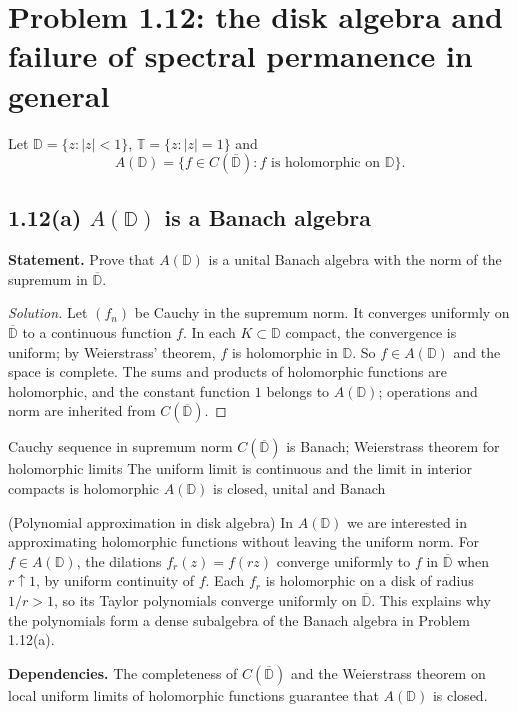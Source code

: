 \section{Problem 1.12: the disk algebra and failure of spectral permanence in general}

Let $\mathbb D=\{z:|z|<1\}$, $\mathbb T=\{z:|z|=1\}$ and
\[
 A(\mathbb D)=\{f\in C(\overline{\mathbb D}): f\text{ is holomorphic on }\mathbb D\}.
\]

\subsection*{1.12(a) $A(\mathbb D)$ is a Banach algebra}

\noindent\textbf{Statement.} Prove that $A(\mathbb D)$ is a unital Banach algebra with the norm of the supremum in $\overline{\mathbb D}$.

\begin{proof}[Solution]
Let $(f_n)$ be Cauchy in the supremum norm. It converges uniformly on $\overline{\mathbb D}$ to a
continuous function $f$. In each $K\subset\mathbb D$ compact, the convergence is uniform; by
Weierstrass' theorem, $f$ is holomorphic in $\mathbb D$. So $f\in A(\mathbb D)$ and the space is
complete. The sums and products of holomorphic functions are holomorphic, and the constant function
$1$ belongs to $A(\mathbb D)$; operations and norm are inherited from
$C(\overline{\mathbb D})$.
\end{proof}

\proofdiagram
{Cauchy sequence in supremum norm}
{$C(\overline{\mathbb D})$ is Banach; Weierstrass theorem for holomorphic limits}
{The uniform limit is continuous and the limit in interior compacts is holomorphic}
{$A(\mathbb D)$ is closed, unital and Banach}

\begin{cthejemplo}{(Polynomial approximation in disk algebra)}
In $A(\mathbb D)$ we are interested in approximating holomorphic functions without leaving the uniform norm.
For $f\in A(\mathbb D)$, the dilations $f_r(z)=f(rz)$ converge uniformly to $f$
in $\overline{\mathbb D}$ when $r\uparrow1$, by uniform continuity of $f$.
Each $f_r$ is holomorphic on a disk of radius $1/r>1$, so its Taylor polynomials
converge uniformly on $\overline{\mathbb D}$.
This explains why the polynomials form a dense subalgebra of the Banach algebra in Problem 1.12(a).
\end{cthejemplo}

\noindent\textbf{Dependencies.} The completeness of $C(\overline{\mathbb D})$ and the Weierstrass theorem on local uniform limits of holomorphic functions guarantee that $A(\mathbb D)$ is closed.

